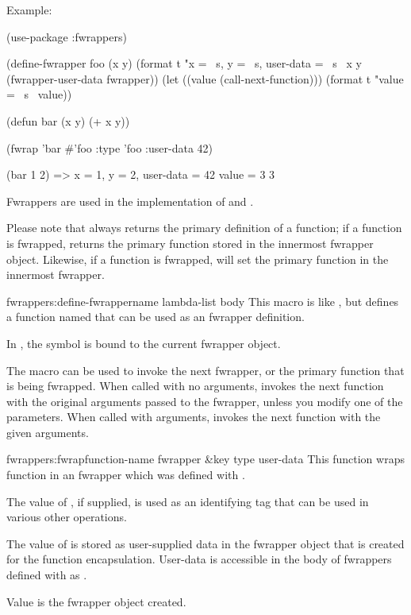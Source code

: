 Example:

\begin{lisp}
(use-package :fwrappers)

(define-fwrapper foo (x y)
  (format t "x = ~s, y = ~s, user-data = ~s~%
          x y (fwrapper-user-data fwrapper))
  (let ((value (call-next-function)))
    (format t "value = ~s~%
    value))

(defun bar (x y)
  (+ x y))

(fwrap 'bar #'foo :type 'foo :user-data 42)

(bar 1 2)
 =>
 x = 1, y = 2, user-data = 42
 value = 3
 3   
\end{lisp}

Fwrappers are used in the implementation of  and
.

Please note that  always returns the primary
definition of a function; if a function is fwrapped,
 returns the primary function stored in the
innermost fwrapper object.  Likewise, if a function is fwrapped,
 will set the primary function in the
innermost fwrapper.

\begin{defmac}{fwrappers:}{define-fwrapper}{name lambda-list \ampbody{} body}
  This macro is like , but defines a function named
   that can be used as an fwrapper definition.
  
  In , the symbol  is bound to the current
  fwrapper object.
  
  The macro  can be used to invoke the next
  fwrapper, or the primary function that is being fwrapped.  When
  called with no arguments,  invokes the next
  function with the original arguments passed to the fwrapper, unless
  you modify one of the parameters.  When called with arguments,
   invokes the next function with the given
  arguments.
\end{defmac}

\begin{defun}{fwrappers:}{fwrap}{function-name fwrapper \&key type
    user-data}
  This function wraps function  in an fwrapper
   which was defined with .

  The value of , if supplied, is used as an identifying
  tag that can be used in various other operations.
  
  The value of  is stored as user-supplied data in the
  fwrapper object that is created for the function encapsulation.
  User-data is accessible in the body of fwrappers defined with
   as .

  Value is the fwrapper object created.
\end{defun}


